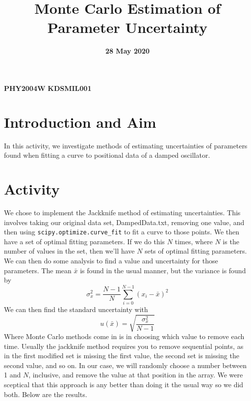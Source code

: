\documentclass[12pt]{article}
\title{Monte Carlo Estimation of Parameter Uncertainty}
\date{\textbf{28 May 2020}}
\author{}
\begin{document}
    \maketitle
    \begin{center}
    \textbf{\large{PHY2004W}}
    \textbf{\large{KDSMIL001}}
    \end{center}
    
    \section{Introduction and Aim}
    In this activity, we investigate methods of estimating uncertainties of parameters found when 
    fitting a curve to positional data of a damped oscillator.

    \section{Activity}
    We chose to implement the Jackknife method of estimating uncertainties. This involves taking our 
    original data set, DampedData.txt, removing one value, and then using \texttt{scipy.optimize.curve\_fit} 
    to fit a curve to those points. We then have a set of optimal fitting parameters. If we do this 
    $N$ times, where $N$ is the number of values in the set, then we'll have $N$ sets of optimal fitting 
    parameters. We can then do some analysis to find a value and uncertainty for those parameters. 
    The mean $\bar{x}$ is found in the usual manner, but the variance is found by
    \begin{equation}
        \sigma_x^2 = \frac{N-1}{N}\sum_{i=0}^{N-1}(x_i-\bar{x})^2
    \end{equation}
    \noindent
    We can then find the standard uncertainty with 
    \begin{equation}
        u(\bar{x}) = \sqrt{\frac{\sigma_x^2}{N-1}}
    \end{equation}
    \noindent
    Where Monte Carlo methods come in is in choosing which value to remove each time. Usually the 
    jackknife method requires you to remove sequential points, as in the first modified set is missing 
    the first value, the second set is missing the second value, and so on. In our case, we will 
    randomly choose a number between 1 and $N$, inclusive, and remove the value at that position in 
    the array. We were sceptical that this approach is any better than doing it the usual way so we
    did both. Below are the results.
\end{document}
